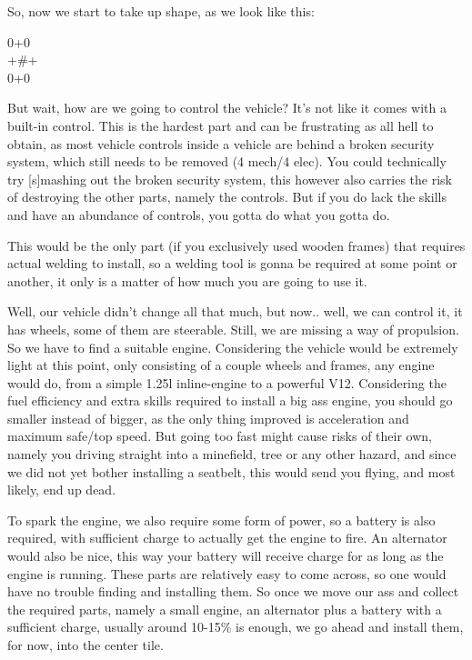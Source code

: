 So, now we start to take up shape, as we look like this:

\vspace{0.5\baselineskip}
\begin{spacing}{0.75}
0+0\\
+\#+\\
0+0
\end{spacing}
\vspace{0.5\baselineskip}

But wait, how are we going to control the vehicle? It's not like it comes with a built-in control. This is the hardest part and can be frustrating as all hell to obtain, as most vehicle controls inside a vehicle are behind a broken security system, which still needs to be removed (4 mech/4 elec). You could technically try [s]mashing out the broken security system, this however also carries the risk of destroying the other parts, namely the controls. But if you do lack the skills and have an abundance of controls, you gotta do what you gotta do.

This would be the only part (if you exclusively used wooden frames) that requires actual welding to install, so a welding tool is gonna be required at some point or another, it only is a matter of how much you are going to use it.

Well, our vehicle didn't change all that much, but now.. well, we can control it, it has wheels, some of them are steerable. Still, we are missing a way of propulsion. So we have to find a suitable engine. Considering the vehicle would be extremely light at this point, only consisting of a couple wheels and frames, any engine would do, from a simple 1.25l inline-engine to a powerful V12. Considering the fuel efficiency and extra skills required to install a big ass engine, you should go smaller instead of bigger, as the only thing improved is acceleration and maximum safe/top speed. But going too fast might cause risks of their own, namely you driving straight into a minefield, tree or any other hazard, and since we did not yet bother installing a seatbelt, this would send you flying, and most likely, end up dead.

To spark the engine, we also require some form of power, so a battery is also required, with sufficient charge to actually get the engine to fire. An alternator would also be nice, this way your battery will receive charge for as long as the engine is running. These parts are relatively easy to come across, so one would have no trouble finding and installing them. So once we move our ass and collect the required parts, namely a small engine, an alternator plus a battery with a sufficient charge, usually around 10-15\% is enough, we go ahead and install them, for now, into the center tile.

